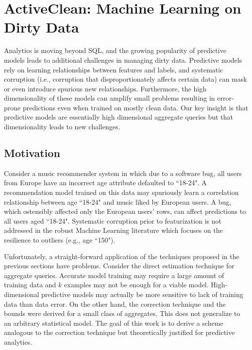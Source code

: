 \section{ActiveClean: Machine Learning on Dirty Data}
Analytics is moving beyond SQL, and the growing popularity of predictive models \cite{bdas, alexandrov2014stratosphere, crotty2014tupleware, hellerstein2012madlib} leads to additional challenges in managing dirty data.
Predictive models rely on learning relationships between features and labels, and systematic corruption \cite{taylor1982introduction} (i.e., corruption that disproportionately affects certain data) can mask or even introduce spurious new relationships.
Furthermore, the high dimensionality of these models can amplify small problems \cite{xiaofeature} resulting in error-prone predictions even when trained on mostly clean data.
Our key insight is that predictive models are essentially high dimensional aggregate queries but that dimensionality leads to new challenges.

\subsection{Motivation}
Consider a music recommender system in which due to a software bug, all users from Europe have an incorrect age attribute defaulted to ``18-24".
A recommendation model trained on this data may spuriously learn a correlation relationship between age ``18-24" and music liked by European users.
A bug, which ostensibly affected only the European users' rows, can affect predictions to all users aged ``18-24".
Systematic corruption prior to featurization is not addressed in the robust Machine Learning literature which focuses on the resilience to outliers (e.g., age ``150").

Unfortunately, a straight-forward application of the techniques proposed in the previous sections have problems.
Consider the direct estimation technique for aggregate queries.
Accurate model training may require a large amount of training data and $k$ examples may not be enough for a viable model.
High-dimensional predictive models may actually be more sensitive to lack of training data than data error.
On the other hand, the correction technique and the bounds were derived for a small class of aggregates.
This does not generalize to an arbitrary statistical model. 
The goal of this work is to derive a scheme analogous to the correction technique but theoretically justified for predictive analytics.

